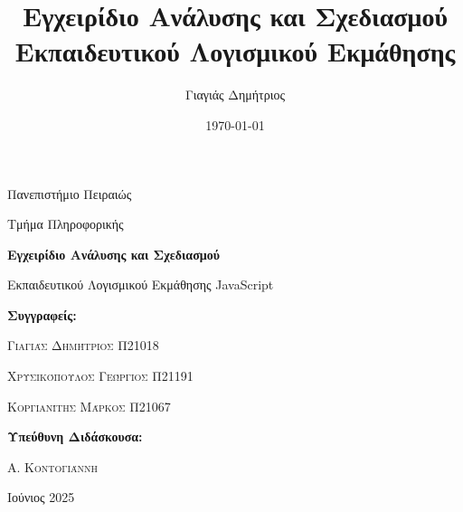\documentclass[12pt, a4paper]{article}
\title{Εγχειρίδιο Ανάλυσης και Σχεδιασμού\\Εκπαιδευτικού Λογισμικού Εκμάθησης \eng{JavaScript}}
\author{Γιαγιάς Δημήτριος}
\date{\today}
\newcommand{\eng}[1]{\foreignlanguage{english}{#1}}
\begin{document}

\begin{titlingpage}
    \centering
    \vspace*{2cm}
    {\Huge Πανεπιστήμιο Πειραιώς\par}
    {\large Τμήμα Πληροφορικής\par}
    \vspace{2cm}
    {\Huge \textbf{Εγχειρίδιο Ανάλυσης και Σχεδιασμού}\par}
    \vspace{1cm}
    {\LARGE Εκπαιδευτικού Λογισμικού Εκμάθησης \eng{JavaScript}\par}
    \vspace{2cm}
    {\Large \textbf{Συγγραφείς:}\par}
    {\Large \textsc{Γιαγιάς Δημήτριος Π21018}\par}
    {\Large \textsc{Χρυσικόπουλος Γεώργιος Π21191}\par}
    {\Large \textsc{Κοργιανίτης Μάρκος Π21067}\par}
    \vspace{3cm}
    {\Large \textbf{Υπεύθυνη Διδάσκουσα:}\par}
    {\Large \textsc{Α. Κοντογιάννη}\par}
    \vfill
    {\large Ιούνιος 2025\par}
    \vspace*{1cm}
    \thispagestyle{empty}
\end{titlingpage}

\newpage
{}
\tableofcontents
\newpage
{}
\setcounter{page}{1}






\end{document}
